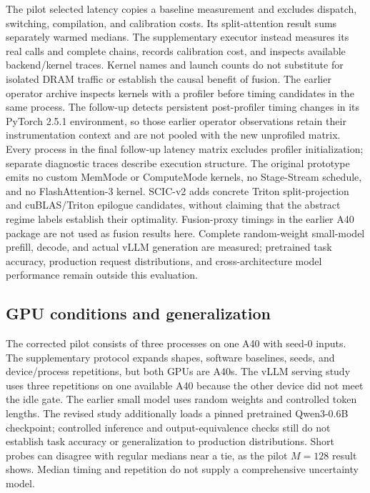 \documentclass[a4paper,fleqn]{cas-dc}
\begin{document}
The pilot selected latency copies a baseline measurement and excludes dispatch, switching, compilation, and calibration costs.
Its split-attention result sums separately warmed medians.
The supplementary executor instead measures its real calls and complete chains, records calibration cost, and inspects available backend/kernel traces.
Kernel names and launch counts do not substitute for isolated DRAM traffic or establish the causal benefit of fusion.
The earlier operator archive inspects kernels with a profiler before timing candidates in the same process.
The follow-up detects persistent post-profiler timing changes in its PyTorch 2.5.1 environment, so those earlier operator observations retain their instrumentation context and are not pooled with the new unprofiled matrix.
Every process in the final follow-up latency matrix excludes profiler initialization; separate diagnostic traces describe execution structure.
The original prototype emits no custom MemMode or ComputeMode kernels, no Stage-Stream schedule, and no FlashAttention-3 kernel. SCIC-v2 adds concrete Triton split-projection and cuBLAS/Triton epilogue candidates, without claiming that the abstract regime labels establish their optimality.
Fusion-proxy timings in the earlier A40 package are not used as fusion results here.
Complete random-weight small-model prefill, decode, and actual vLLM generation are measured; pretrained task accuracy, production request distributions, and cross-architecture model performance remain outside this evaluation.

\subsection{GPU conditions and generalization}
\label{sec:archives}

The corrected pilot consists of three processes on one A40 with seed-0 inputs.
The supplementary protocol expands shapes, software baselines, seeds, and device/process repetitions, but both GPUs are A40s.
The vLLM serving study uses three repetitions on one available A40 because the other device did not meet the idle gate.
The earlier small model uses random weights and controlled token lengths. The revised study additionally loads a pinned pretrained Qwen3-0.6B checkpoint; controlled inference and output-equivalence checks still do not establish task accuracy or generalization to production distributions.
Short probes can disagree with regular medians near a tie, as the pilot $M{=}128$ result shows.
Median timing and repetition do not supply a comprehensive uncertainty model.
\end{document}
